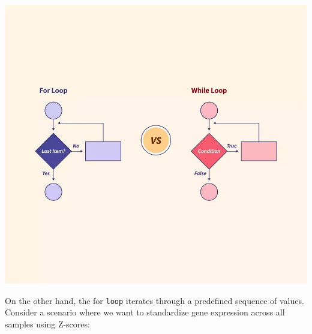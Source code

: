 \documentclass[
]{book}
\begin{document}
\includegraphics{images/forloop.png}

On the other hand, the for \texttt{loop} iterates through a predefined sequence of values. Consider a scenario where we want to standardize gene expression across all samples using Z-scores:
\end{document}
